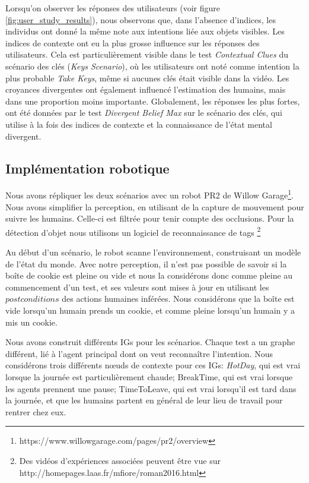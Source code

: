 \documentclass[a4paper,11pt,twoside]{StyleThese}
\begin{document}
Lorsqu'on observer les réponses des utilisateurs (voir figure \ref{fig:user_study_results}), nous observons que, dans l'absence d'indices, les individus ont donné la même note aux intentions liée aux objets visibles. Les indices de contexte ont eu la plus grosse influence sur les réponses des utilisateurs. Cela est particulièrement visible dans le test \textit{Contextual Clues} du scénario des clés (\textit{Keys Scenario}), où les utilisateurs ont noté comme intention la plus probable \textit{Take Keys}, même si aucunes clés était visible dans la vidéo. Les croyances divergentes ont également influencé l'estimation des humains, mais dans une proportion moins importante. Globalement, les réponses les plus fortes, ont été données par le test \textit{Divergent Belief Max} sur le scénario des clés, qui utilise à la fois des indices de contexte et la connaissance de l'état mental divergent.

\subsection{Implémentation robotique}
Nous avons répliquer les deux scénarios avec un robot PR2 de Willow Garage\footnote{https://www.willowgarage.com/pages/pr2/overview}. Nous avons simplifier la perception, en utilisant de la capture de mouvement pour suivre les humains. Celle-ci est filtrée pour tenir compte des occlusions. Pour la détection d'objet nous utilisons un logiciel de reconnaissance de tags \footnote{Des vidéos d'expériences associées peuvent être vue sur  http://homepages.laas.fr/mfiore/roman2016.html} 

Au début d'un scénario, le robot scanne l'environnement, construisant un modèle de l'état du monde. Avec notre perception, il n'est pas possible de savoir si la boîte de cookie est pleine ou vide et nous la considérons donc comme pleine au commencement d'un test, et ses valeurs sont mises à jour en utilisant les $postconditions$ des actions humaines inférées. Nous considérons que la boîte est vide lorsqu'un humain prends un cookie, et comme pleine lorsqu'un humain y a mis un cookie.

Nous avons construit différents IGs pour les scénarios. Chaque test a un graphe différent, lié à l'agent principal dont on veut reconnaître l'intention. Nous considérons trois différents nœuds de contexte pour ces IGs: \textit{HotDay}, qui est vrai lorsque la journée est particulièrement chaude; BreakTime, qui est vrai lorsque les agents prennent une pause; TimeToLeave, qui est vrai lorsqu'il est tard dans la journée, et que les humains partent en général de leur lieu de travail pour rentrer chez eux.
\end{document}
